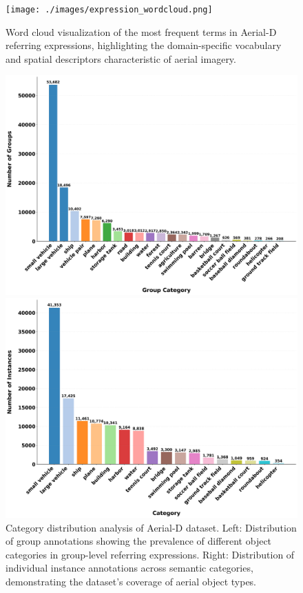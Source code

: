 \begin{figure}[H]
\centering
\texttt{[image: ./images/expression\_wordcloud.png]}
\caption{Word cloud visualization of the most frequent terms in Aerial-D referring expressions, highlighting the domain-specific vocabulary and spatial descriptors characteristic of aerial imagery.}
\label{fig:expression_wordcloud}
\end{figure}

\begin{figure}[t]
\centering
\begin{minipage}{0.48\textwidth}
\centering
\includegraphics[width=\textwidth]{./images/group_category_distribution.png}
\end{minipage}\hfill
\begin{minipage}{0.48\textwidth}
\centering
\includegraphics[width=\textwidth]{./images/instance_category_distribution.png}
\end{minipage}
\caption{Category distribution analysis of Aerial-D dataset. Left: Distribution of group annotations showing the prevalence of different object categories in group-level referring expressions. Right: Distribution of individual instance annotations across semantic categories, demonstrating the dataset's coverage of aerial object types.}
\label{fig:category_distributions}
\end{figure}

